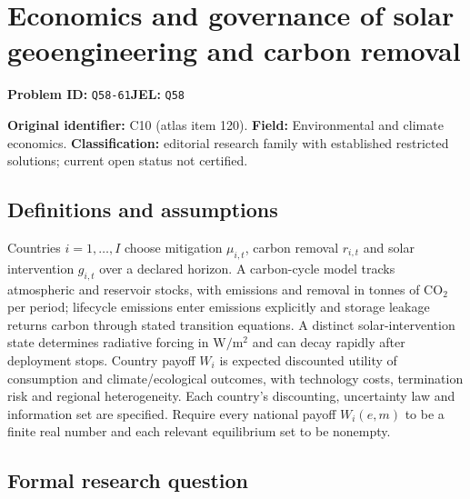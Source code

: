 \documentclass[11pt,a4paper]{article}
\begin{document}
\section*{Economics and governance of solar geoengineering and carbon removal}
\textbf{Problem ID:} \texttt{Q58-61}\quad \textbf{JEL:} \texttt{Q58}\par
\label{problem:OP-0120}
\label{atlas:prob:C10}

\noindent\textbf{Original identifier:} C10 (atlas item 120). \textbf{Field:} Environmental and climate economics. \textbf{Classification:} editorial research family with established restricted solutions; current open status not certified.

\subsection*{Definitions and assumptions}

Countries $i=1,\ldots,I$ choose mitigation $\mu_{i,t}$, carbon removal $r_{i,t}$ and solar intervention $g_{i,t}$ over a declared horizon. A carbon-cycle model tracks atmospheric and reservoir stocks, with emissions and removal in tonnes of $\mathrm{CO}_2$ per period; lifecycle emissions enter emissions explicitly and storage leakage returns carbon through stated transition equations. A distinct solar-intervention state determines radiative forcing in $\mathrm W/\mathrm m^2$ and can decay rapidly after deployment stops. Country payoff $W_i$ is expected discounted utility of consumption and climate/ecological outcomes, with technology costs, termination risk and regional heterogeneity. Each country's discounting, uncertainty law and information set are specified. Require every national payoff $W_i(e,m)$ to be a finite real number and each relevant equilibrium set to be nonempty.

\subsection*{Formal research question}
\end{document}
